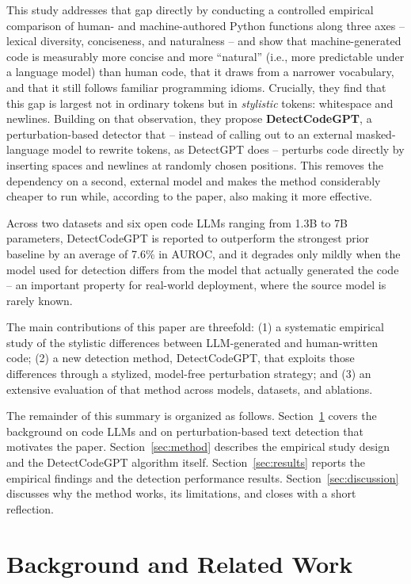 \documentclass[manuscript,review]{acmart}
\begin{document}
This study addresses that gap directly by conducting a controlled empirical comparison of human- and machine-authored Python functions along three axes -- lexical diversity, conciseness, and naturalness -- and show that machine-generated code is measurably more concise and more ``natural'' (i.e., more predictable under a language model) than human code, that it draws from a narrower vocabulary, and that it still follows familiar programming idioms. Crucially, they find that this gap is largest not in ordinary tokens but in \emph{stylistic} tokens: whitespace and newlines. Building on that observation, they propose \textbf{DetectCodeGPT}, a perturbation-based detector that -- instead of calling out to an external masked-language model to rewrite tokens, as DetectGPT does -- perturbs code directly by inserting spaces and newlines at randomly chosen positions. This removes the dependency on a second, external model and makes the method considerably cheaper to run while, according to the paper, also making it more effective.

Across two datasets and six open code LLMs ranging from 1.3B to 7B parameters, DetectCodeGPT is reported to outperform the strongest prior baseline by an average of 7.6\% in AUROC, and it degrades only mildly when the model used for detection differs from the model that actually generated the code -- an important property for real-world deployment, where the source model is rarely known.

The main contributions of this paper are threefold: (1) a systematic empirical study of the stylistic differences between LLM-generated and human-written code; (2) a new detection method, DetectCodeGPT, that exploits those differences through a stylized, model-free perturbation strategy; and (3) an extensive evaluation of that method across models, datasets, and ablations.

The remainder of this summary is organized as follows. Section~\ref{sec:background} covers the background on code LLMs and on perturbation-based text detection that motivates the paper. Section~\ref{sec:method} describes the empirical study design and the DetectCodeGPT algorithm itself. Section~\ref{sec:results} reports the empirical findings and the detection performance results. Section~\ref{sec:discussion} discusses why the method works, its limitations, and closes with a short reflection.

\section{Background and Related Work}
\label{sec:background}
\end{document}
